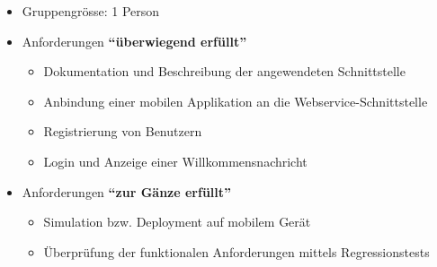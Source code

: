 \begin{itemize}
	\item Gruppengrösse: 1 Person
	\item Anforderungen \textbf{``überwiegend erfüllt''}
	\begin{itemize}
		\item Dokumentation und Beschreibung der angewendeten Schnittstelle
		\item Anbindung einer mobilen Applikation an die Webservice-Schnittstelle
		\item Registrierung von Benutzern
		\item Login und Anzeige einer Willkommensnachricht
	\end{itemize}
	\item Anforderungen \textbf{``zur Gänze erfüllt''}
	\begin{itemize}
		\item Simulation bzw. Deployment auf mobilem Gerät
		\item Überprüfung der funktionalen Anforderungen mittels Regressionstests
	\end{itemize}
\end{itemize}

\clearpage

